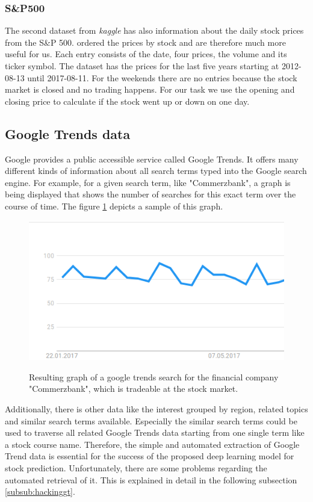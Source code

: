 \subsubsection{S\&P500}
\label{subsub:sp500}
The second dataset from \textit{kaggle} has also information about the daily stock prices from the S\&P 500. \cite{SP500} ordered the prices by stock and are therefore much more useful for us. Each entry consists of the date, four prices, the volume and its ticker symbol. The dataset has the prices for the last five years starting at 2012-08-13 until 2017-08-11. For the weekends there are no entries because the stock market is closed and no trading happens. For our task we use the opening and closing price to calculate if the stock went up or down on one day.


\subsection{Google Trends data}
\label{subsec:gtdata}
Google provides a public accessible service called Google Trends. It offers many different kinds of information about all search terms typed into the Google search engine. For example, for a given search term, like "Commerzbank", a graph is being displayed that shows the number of searches for this exact term over the course of time. The figure \ref{fig:gtexample} depicts a sample of this graph. 
\begin{figure}[!ht]
	\caption{Resulting graph of a google trends \cite{googletrends} search for the financial company "Commerzbank", which is tradeable at the stock market. }
	\includegraphics[width=0.95\linewidth]{images/googletrends.png}
	\label{fig:gtexample}
\end{figure}
Additionally, there is other data like the interest grouped by region, related topics and similar search terms available. Especially the similar search terms could be used to traverse all related Google Trends data starting from one single term like a stock course name. Therefore, the simple and automated extraction of Google Trend data is essential for the success of the proposed deep learning model for stock prediction. Unfortunately, there are some problems regarding the automated retrieval of it. This is explained in detail in the following subsection \ref{subsub:hackinggt}.


